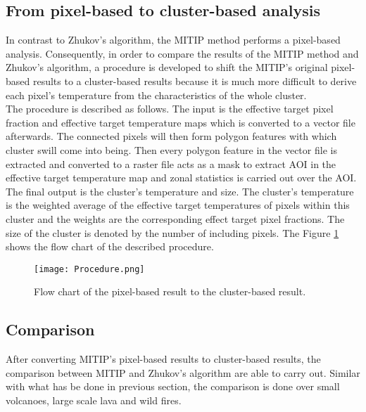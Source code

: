 \subsection{From pixel-based to cluster-based analysis}
In contrast to Zhukov's algorithm, the MITIP method performs a pixel-based analysis. Consequently, in order to compare the results of the MITIP method and Zhukov's algorithm, a procedure is developed to shift the MITIP's original pixel-based results to a cluster-based results because it is much more difficult to derive each pixel's temperature from the characteristics of the whole cluster. \\

\noindent The procedure is described as follows. The input is the effective target pixel fraction and effective target temperature maps which is converted to a vector file afterwards. The connected pixels will then form polygon features with which cluster swill come into being. Then every polygon feature in the vector file is extracted and converted to a raster file acts as a mask to extract AOI in the effective target temperature map and zonal statistics is carried out over the AOI. The final output is the cluster's temperature and size. The cluster's temperature is the weighted average of the effective target temperatures of pixels within this cluster and the weights are the corresponding effect target pixel fractions. The size of the cluster is denoted by the number of including pixels. The Figure \ref{fig:P2C} shows the flow chart of the described procedure.\\

\begin{figure}[!htbp]
\centering
\texttt{[image: Procedure.png]}
\caption{Flow chart of the pixel-based result to the cluster-based result.}
\label{fig:P2C}
\end{figure}


\subsection{Comparison}
After converting MITIP's pixel-based results to cluster-based results, the comparison between MITIP and Zhukov's algorithm are able to carry out. Similar with what has be done in previous section, the comparison is done over small volcanoes, large scale lava and wild fires.\\

